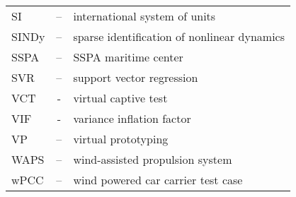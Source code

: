 \begin{tabular}{ l c l }
SI  & -- & international system of units\\
SINDy  & -- & sparse identification of nonlinear dynamics \\
SSPA & -- & SSPA maritime center \\
SVR & -- & support vector regression \\
VCT & - & virtual captive test \\
VIF & - & variance inflation factor \\
VP & -- & virtual prototyping \\
WAPS & -- & wind-assisted propulsion system\\
wPCC & -- & wind powered car carrier test case\\
\end{tabular}
